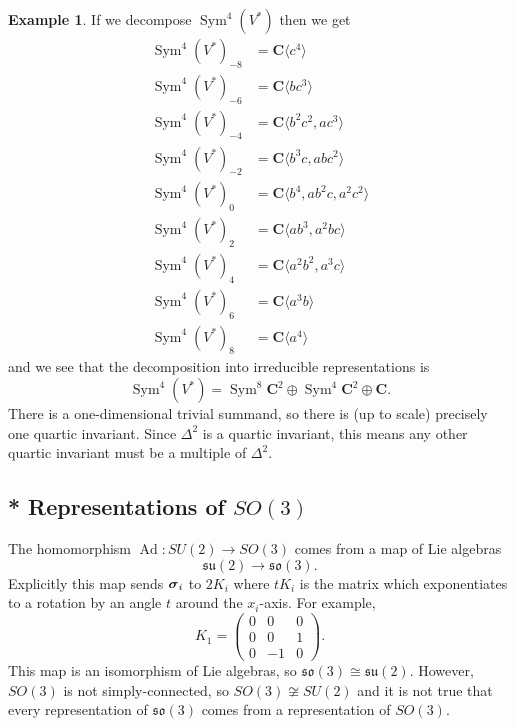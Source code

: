 \documentclass[12pt]{article}
\renewcommand\vec[1]{\ensuremath\boldsymbol{#1}}
\newcommand{\CC}{\mathbf{C}}
\newcommand{\OP}{\operatorname}
\newcommand{\Ad}{\OP{Ad}}
\theoremstyle{definition}
\newtheorem{exm}[thm]{Example}
\theoremstyle{check}
\theoremstyle{remark}
\theoremstyle{TheoremNum}
\begin{document}
\begin{exm}
If we decompose $\OP{Sym}^4(V^*)$ then we get
\begin{align*}
\OP{Sym}^4(V^*)_{-8}&=\CC\langle c^4\rangle\\
\OP{Sym}^4(V^*)_{-6}&=\CC\langle bc^3\rangle\\
\OP{Sym}^4(V^*)_{-4}&=\CC\langle b^2c^2,ac^3\rangle\\
\OP{Sym}^4(V^*)_{-2}&=\CC\langle b^3c,abc^2\rangle\\
\OP{Sym}^4(V^*)_{0}&=\CC\langle b^4,ab^2c,a^2c^2\rangle\\
\OP{Sym}^4(V^*)_{2}&=\CC\langle ab^3,a^2bc\rangle\\
\OP{Sym}^4(V^*)_{4}&=\CC\langle a^2b^2,a^3c\rangle\\
\OP{Sym}^4(V^*)_{6}&=\CC\langle a^3b\rangle\\
\OP{Sym}^4(V^*)_{8}&=\CC\langle a^4\rangle
\end{align*}
and we see that the decomposition into irreducible representations is
\[\OP{Sym}^4(V^*)=\OP{Sym}^8\CC^2\oplus\OP{Sym}^4\CC^2\oplus\CC.\]
There is a one-dimensional trivial summand, so there is (up to scale) precisely one quartic invariant. Since $\Delta^2$ is a quartic invariant, this means any other quartic invariant must be a multiple of $\Delta^2$.
\end{exm}


\subsection{* Representations of \texorpdfstring{$SO(3)$}{SO(3)}}

The homomorphism $\Ad\colon SU(2)\to SO(3)$ comes from a map of Lie algebras
\[\mathfrak{su}(2)\to\mathfrak{so}(3).\]
Explicitly this map sends $\vec{\sigma}_i$ to $2K_i$ where $tK_i$ is the matrix which exponentiates to a rotation by an angle $t$ around the $x_i$-axis. For example,
\[K_1=\left(\begin{array}{ccc}0 & 0 & 0\\
0 & 0 & 1\\
0 & -1 & 0\end{array}\right).\]
This map is an isomorphism of Lie algebras, so $\mathfrak{so}(3)\cong\mathfrak{su}(2)$. However, $SO(3)$ is not simply-connected, so $SO(3)\not\cong SU(2)$ and it is not true that every representation of $\mathfrak{so}(3)$ comes from a representation of $SO(3)$.
\end{document}
